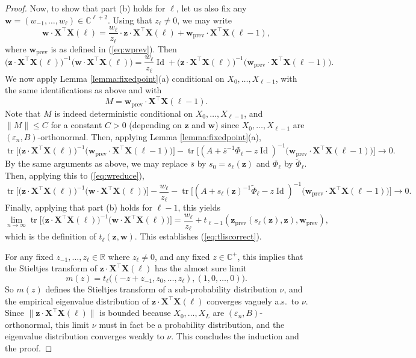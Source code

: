 \documentclass{article}
\theoremstyle{definition}
\newcommand{\R}{\mathbb{R}}
\newcommand{\C}{\mathbb{C}}
\newcommand{\Id}{\operatorname{Id}}
\newcommand{\prev}{{\text{prev}}}
\newcommand{\tr}{\operatorname{tr}}
\newcommand{\z}{\mathbf{z}}
\newcommand{\w}{\mathbf{w}}
\newcommand{\eps}{\varepsilon}
\newcommand{\bX}{\mathbf{X}}
\newcommand{\1}{\mathbf{1}}
\begin{document}
\begin{proof}
Now, to show that part (b) holds for $\ell$, let us also fix
any $\w=(w_{-1},\ldots,w_\ell) \in \C^{\ell+2}$. Using that $z_\ell \neq 0$,
we may write
\[\w \cdot \bX^\top \bX(\ell)
=\frac{w_\ell}{z_\ell}\cdot  \z \cdot \bX^\top \bX(\ell)
+\w_\prev \cdot \bX^\top \bX(\ell-1),\]
where $\w_\prev$ is as defined in (\ref{eq:wprev}). Then
\begin{equation}\label{eq:wreduce}
\Big(\z \cdot \bX^\top \bX(\ell)\Big)^{-1}
\Big(\w \cdot \bX^\top \bX(\ell)\Big)
=\frac{w_\ell}{z_\ell}\Id+
\Big(\z \cdot \bX^\top \bX(\ell)\Big)^{-1}
\Big(\w_\prev \cdot \bX^\top \bX(\ell-1)\Big).
\end{equation}
We now apply Lemma \ref{lemma:fixedpoint}(a) conditional on
$X_0,\ldots,X_{\ell-1}$, with the same identifications as above and with
\[M=\w_\prev \cdot \bX^\top \bX(\ell-1).\]
Note that $M$ is indeed deterministic conditional on $X_0,\ldots,X_{\ell-1}$,
and $\|M\| \leq C$ for a constant $C>0$ (depending on $\z$ and $\w$) since
$X_0,\ldots,X_{\ell-1}$ are $(\eps_n,B)$-orthonormal. Then, applying Lemma
\ref{lemma:fixedpoint}(a),
\[\tr \Big[\Big(\z \cdot \bX^\top \bX(\ell)\Big)^{-1}
\Big(\w_\prev \cdot \bX^\top \bX(\ell-1)\Big)\Big]-
\tr \Big[(A+\bar{s}^{-1}\Phi_\ell-z\Id)^{-1}
\Big(\w_\prev \cdot \bX^\top \bX(\ell-1)\Big)\Big] \to 0.\]
By the same arguments as above, we may replace $\bar{s}$ by $s_0=s_\ell(\z)$
and $\Phi_\ell$ by $\tilde{\Phi}_\ell$. Then, applying this to
(\ref{eq:wreduce}),
\[\tr \Big[\Big(\z \cdot \bX^\top \bX(\ell)\Big)^{-1}
\Big(\w \cdot \bX^\top \bX(\ell)\Big)\Big]
-\frac{w_\ell}{z_\ell}-
\tr \Big[(A+s_\ell(\z)^{-1}\tilde{\Phi}_\ell-z\Id)^{-1}
\Big(\w_\prev \cdot \bX^\top \bX(\ell-1)\Big)\Big] \to 0.\]
Finally, applying that part (b) holds for $\ell-1$, this yields
\[\lim_{n \to \infty} \tr
\Big[\Big(\z \cdot \bX^\top \bX(\ell)\Big)^{-1}
\Big(\w \cdot \bX^\top \bX(\ell)\Big)\Big]
=\frac{w_\ell}{z_\ell}+t_{\ell-1}(\z_\prev(s_\ell(\z),\z),\w_\prev),\]
which is the definition of $t_\ell(\z,\w)$. This establishes
(\ref{eq:tliscorrect}).

For any fixed $z_{-1},\ldots,z_\ell \in \R$ where $z_\ell \neq 0$, and any fixed
$z \in \C^+$, this implies that the Stieltjes transform of $\z \cdot
\bX^\top \bX(\ell)$ has the almost sure limit
\[m(z)=t_\ell\Big((-z+z_{-1},z_0,\ldots,z_\ell),(1,0,\ldots,0)\Big).\]
So $m(z)$ defines the Stieltjes transform of a sub-probability
distribution $\nu$, and the empirical eigenvalue distribution of
$\z \cdot \bX^\top \bX(\ell)$ converges vaguely a.s.\ to $\nu$.
Since $\|\z \cdot \bX^\top \bX(\ell)\|$ is bounded because
$X_0,\ldots,X_L$ are $(\eps_n,B)$-orthonormal, this limit $\nu$ must in
fact be a probability distribution, and the eigenvalue distribution converges
weakly to $\nu$. This concludes the induction and the proof.
\end{proof}
\end{document}

